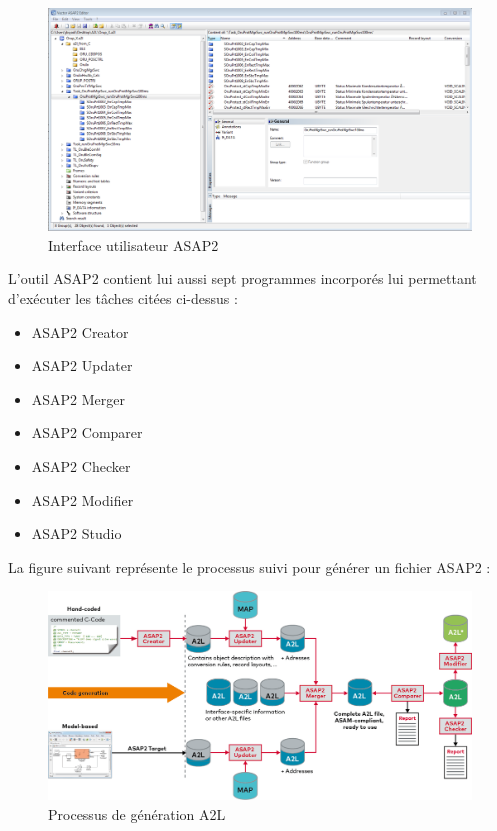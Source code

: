 \begin{figure}[H]
 \centering
 \includegraphics[scale=0.4]{images/asap_ui}
 \caption{Interface utilisateur ASAP2}
\end{figure}

\noindent L'outil ASAP2 contient lui aussi sept programmes incorporés lui permettant d'exécuter les tâches citées ci-dessus : 

\begin{itemize}
	\item ASAP2 Creator
	\item ASAP2 Updater
	\item ASAP2 Merger
	\item ASAP2 Comparer
	\item ASAP2 Checker
	\item ASAP2 Modifier
	\item ASAP2 Studio
\end{itemize}

\noindent La figure suivant représente le processus suivi pour générer un fichier ASAP2 : 

\begin{figure}[H]
 \centering
 \includegraphics[scale=0.35]{images/process_a2L}
 \caption{Processus de génération A2L}
\end{figure}


